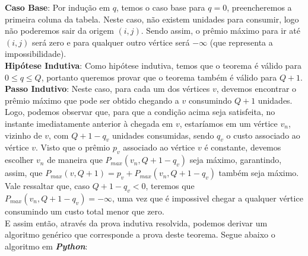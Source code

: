 \documentclass[paper=a4, fontsize=11pt]{scrartcl} %
\numberwithin{equation}{section} %
\numberwithin{figure}{section} %
\numberwithin{table}{section} %
\begin{document}
\textbf{Caso Base}: Por indução em $q$, temos o caso base para $q = 0$, preencheremos a primeira coluna da tabela. Neste caso, não existem unidades para consumir, logo não poderemos sair da origem $(i,j)$. Sendo assim, o prêmio máximo para ir até $(i,j)$ será zero e para qualquer outro vértice será $-\infty$ (que representa a impossibilidade). \\

\textbf{Hipótese Indutiva}: Como hipótese indutiva, temos que o teorema é válido para $0 \leq q \leq Q$, portanto queremos provar que o teorema também é válido para $Q+1$. \\

\textbf{Passo Indutivo}: Neste caso, para cada um dos vértices $v$, devemos encontrar o prêmio máximo que pode ser obtido chegando a $v$ consumindo $Q+1$ unidades. Logo, podemos observar que, para que a condição acima seja satisfeita, no instante imediatamente anterior à chegada em $v$, estaríamos em um vértice $v_n$, vizinho de $v$, com $Q+1-q_v$ unidades consumidas, sendo $q_v$ o custo associado ao vértice $v$. Visto que o prêmio $p_v$ associado ao vértice $v$ é constante, devemos escolher $v_n$ de maneira que $P_{max}(v_n,Q+1-q_v)$ seja máximo, garantindo, assim, que $P_{max}(v,Q+1) = p_v + P_{max}(v_n,Q+1-q_v)$ também seja máximo. Vale ressaltar que, caso $Q+1-q_v < 0$, teremos que $P_{max}(v_n,Q+1-q_v) = -\infty$, uma vez que é impossivel chegar a qualquer vértice consumindo um custo total menor que zero. \\

E assim então, através da prova indutiva resolvida, podemos derivar um algoritmo genérico que corresponde a prova deste teorema. Segue abaixo o algoritmo em \emph{\textbf{Python}}:\\
\end{document}
